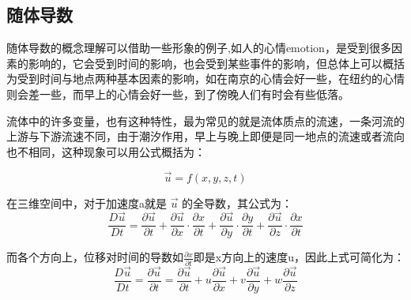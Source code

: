 \documentclass[a4paper,12pt]{article}
\begin{document}
	\subsection{随体导数}
		随体导数的概念理解可以借助一些形象的例子,如人的心情emotion，是受到很多因素的影响的，它会受到时间的影响，也会受到某些事件的影响，但总体上可以概括为受到时间与地点两种基本因素的影响，如在南京的心情会好一些，在纽约的心情则会差一些，而早上的心情会好一些，到了傍晚人们有时会有些低落。\par
		流体中的许多变量，也有这种特性，最为常见的就是流体质点的流速，一条河流的上游与下游流速不同，由于潮汐作用，早上与晚上即便是同一地点的流速或者流向也不相同，这种现象可以用公式概括为：\par
		\[
			\vec{u}=f(x,y,z,t)
		\] \par
		在三维空间中，对于加速度a就是 $\vec{u}$ 的全导数，其公式为：
		\[
			\frac{D \vec{u}}{Dt} = \frac{\partial \vec{u}}{\partial t}
		+\frac{\partial \vec{u}}{\partial x} \cdot \frac{\partial x}{\partial t}
		+\frac{\partial \vec{u}}{\partial y} \cdot \frac{\partial y}{\partial t}
		+\frac{\partial \vec{u}}{\partial z} \cdot \frac{\partial x}{\partial t}
		\] \par
		而各个方向上，位移对时间的导数如$\frac{\partial x}{\partial t}$即是x方向上的速度u，因此上式可简化为：
		\begin{equation}
			\frac{D \vec{u}}{Dt} = \frac{\partial \vec{u}}{\partial t}
			 =\frac{\partial \vec{u}}{\partial t}
			 +u\frac{\partial \vec{u}}{\partial x}
			 +v\frac{\partial \vec{u}}{\partial y}
			 +w\frac{\partial \vec{u}}{\partial z}
		\end{equation} \par
\end{document}
